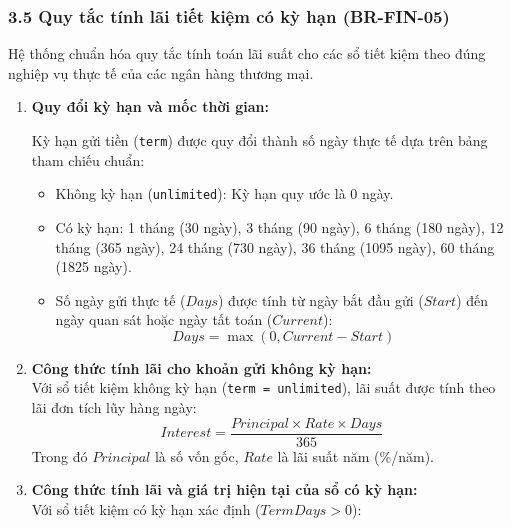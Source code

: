 \documentclass[11pt,a4paper]{article}
\providecommand{\tightlist}{
  \setlength{\itemsep}{0pt}\setlength{\parskip}{0pt}}
\begin{document}
\subsubsection{3.5 Quy tắc tính lãi tiết kiệm có kỳ hạn
(BR-FIN-05)}\label{35-quy-tux1eafc-tuxednh-luxe3i-tiux1ebft-kiux1ec7m-cuxf3-kux1ef3-hux1ea1n-br-fin-05}

Hệ thống chuẩn hóa quy tắc tính toán lãi suất cho các sổ tiết kiệm theo
đúng nghiệp vụ thực tế của các ngân hàng thương mại.

\begin{enumerate}
\def\labelenumi{\arabic{enumi}.}
\item
  \textbf{Quy đổi kỳ hạn và mốc thời gian:}\\
  \begin{center}
  \end{center}
  Kỳ hạn gửi tiền (\texttt{term}) được quy đổi thành số ngày thực tế dựa
  trên bảng tham chiếu chuẩn:

  \begin{itemize}
  \tightlist
  \item
    Không kỳ hạn (\texttt{unlimited}): Kỳ hạn quy ước là 0 ngày.
  \item
    Có kỳ hạn: 1 tháng (30 ngày), 3 tháng (90 ngày), 6 tháng (180 ngày),
    12 tháng (365 ngày), 24 tháng (730 ngày), 36 tháng (1095 ngày), 60
    tháng (1825 ngày).
  \item
    Số ngày gửi thực tế (\(Days\)) được tính từ ngày bắt đầu gửi
    (\(Start\)) đến ngày quan sát hoặc ngày tất toán (\(Current\)):
    \[Days = \max(0, Current - Start)\]
  \end{itemize}
\item
  \textbf{Công thức tính lãi cho khoản gửi không kỳ hạn:}\\
  Với sổ tiết kiệm không kỳ hạn (\texttt{term\ =\ unlimited}), lãi suất
  được tính theo lãi đơn tích lũy hàng ngày:
  \[Interest = \frac{Principal \times Rate \times Days}{365}\] Trong đó
  \(Principal\) là số vốn gốc, \(Rate\) là lãi suất năm (\%/năm).
\item
  \textbf{Công thức tính lãi và giá trị hiện tại của sổ có kỳ hạn:}\\
  Với sổ tiết kiệm có kỳ hạn xác định (\(TermDays > 0\)):


\end{enumerate}
\end{document}
